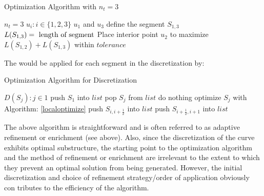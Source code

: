 \begin{algorithm}
\caption{Optimization Algorithm with $n_t=3$}\label{localoptimize}
\begin{algorithmic}[1]
\State $n_t = 3$
\State $u_i : i \in \{1,2,3\}$
\State $u_1 $ and $u_3$ define the segment $S_{1,3}$
  \State $L(S_{1,3}) =\textnormal{ length of segment}$
  \State Place interior point $u_2$ to maximize $L(S_{1,2})+L(S_{1,3})$ within $tolerance$
\EndProcedure
\end{algorithmic}
\end{algorithm}

The would be applied for each segment in the discretization by:

\begin{algorithm}
\caption{Optimization Algorithm for Discretization}
\begin{algorithmic}
  \State $D(S_j) : j \in {1}$
  \State push $S_1$ into $list$ 
    \State pop $S_j$ from $list$
      \State do nothing
    \Else
      \State optimize $S_j$ with Algorithm: \ref{localoptimize}
      \State push $S_{i,i+\frac{1}{2}}$ into $list$
      \State push $S_{i+\frac{1}{2},i+1}$ into $list$
    \EndIf
  \EndWhile
\end{algorithmic}
\end{algorithm}

The above algorithm is straightforward and is often referred to as adaptive refinement or enrichment (see above).  Also, since the discretization of the curve exhibits optimal substructure, the starting point to the optimization algorithm and the method of refinement or enrichment are irrelevant to the extent to which they prevent an optimal solution from being generated.  However, the initial discretization and choice of refinement strategy/order of application obviously con
tributes to the efficiency of the algorithm.

